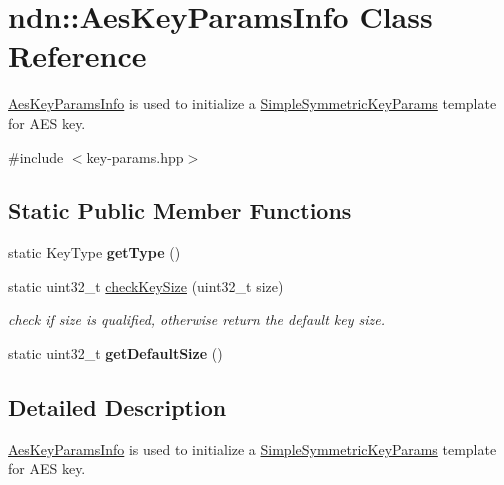 \hypertarget{classndn_1_1AesKeyParamsInfo}{}\section{ndn\+:\+:Aes\+Key\+Params\+Info Class Reference}
\label{classndn_1_1AesKeyParamsInfo}


\hyperlink{classndn_1_1AesKeyParamsInfo}{Aes\+Key\+Params\+Info} is used to initialize a \hyperlink{classndn_1_1SimpleSymmetricKeyParams}{Simple\+Symmetric\+Key\+Params} template for A\+ES key.  




{\ttfamily \#include $<$key-\/params.\+hpp$>$}

\subsection*{Static Public Member Functions}
\begin{DoxyCompactItemize}
\item 
static Key\+Type {\bfseries get\+Type} ()\hypertarget{classndn_1_1AesKeyParamsInfo_ab6eaaec5f232aa9d9798971b2bc41cb4}{}\label{classndn_1_1AesKeyParamsInfo_ab6eaaec5f232aa9d9798971b2bc41cb4}

\item 
static uint32\+\_\+t \hyperlink{classndn_1_1AesKeyParamsInfo_a79532bdab392a670797033da50f3bac0}{check\+Key\+Size} (uint32\+\_\+t size)\hypertarget{classndn_1_1AesKeyParamsInfo_a79532bdab392a670797033da50f3bac0}{}\label{classndn_1_1AesKeyParamsInfo_a79532bdab392a670797033da50f3bac0}

\begin{DoxyCompactList}\small\item\em check if size is qualified, otherwise return the default key size. \end{DoxyCompactList}\item 
static uint32\+\_\+t {\bfseries get\+Default\+Size} ()\hypertarget{classndn_1_1AesKeyParamsInfo_a7f6589e3ca546c0ee3d35d6c49becb98}{}\label{classndn_1_1AesKeyParamsInfo_a7f6589e3ca546c0ee3d35d6c49becb98}

\end{DoxyCompactItemize}


\subsection{Detailed Description}
\hyperlink{classndn_1_1AesKeyParamsInfo}{Aes\+Key\+Params\+Info} is used to initialize a \hyperlink{classndn_1_1SimpleSymmetricKeyParams}{Simple\+Symmetric\+Key\+Params} template for A\+ES key. 


